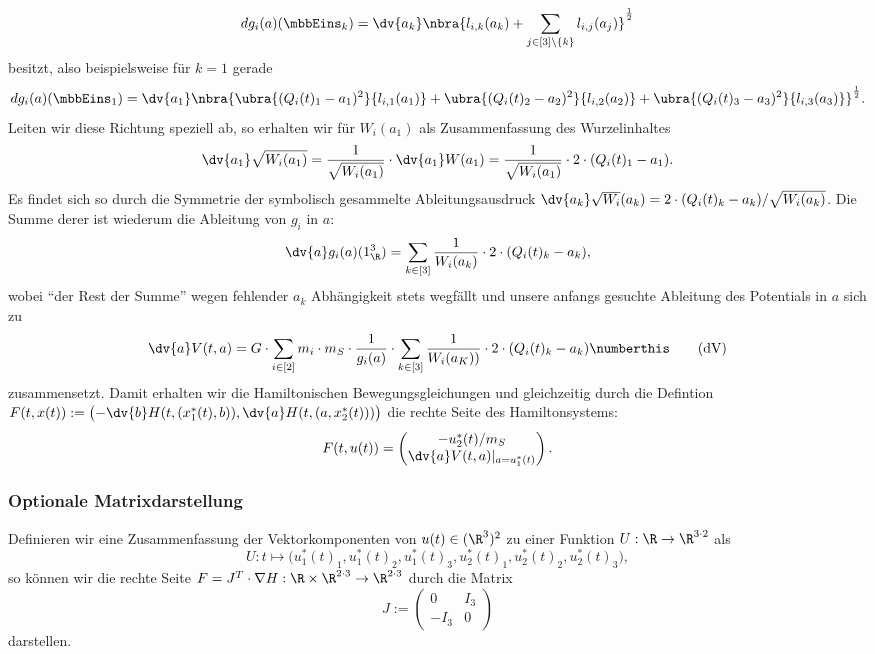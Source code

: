 \documentclass{subfiles}
\begin{document}
        \[
            dg_i(a)(\mbbEins_k) = \dv{a_k}\nbra{l_{i,k}(a_k) + \sum_{j\in[3]\setminus{\{k\}}}l_{i,j}(a_j)}^{\frac12}
        \]
        besitzt, also beispielsweise für $k=1$ gerade
        \[
            dg_i(a)(\mbbEins_1) = \dv{a_1}\nbra{\ubra{(Q_i(t)_1 - a_1)^2}{l_{i,1}(a_1)} + \ubra{(Q_i(t)_2 - a_2)^2}{l_{i,2}(a_2)} + \ubra{(Q_i(t)_3 - a_3)^2}{l_{i,3}(a_3)}}^{\frac12}.
        \]
        Leiten wir diese Richtung speziell ab, so erhalten wir für $W_i(a_1)$ als Zusammenfassung des Wurzelinhaltes
        \[
            \dv{a_1}\sqrt{W_i(a_1)} = \frac{1}{\sqrt{W_i(a_1)}}\cdot\dv{a_1}W(a_1) = \frac{1}{\sqrt{W_i(a_1)}}\cdot 2\cdot (Q_i(t)_1 - a_1). 
        \]
        Es findet sich so durch die Symmetrie der symbolisch gesammelte Ableitungsausdruck $\dv{a_k}\sqrt{W_i}(a_k) = 2\cdot (Q_i(t)_k - a_k) / \sqrt{W_i(a_k)}$. Die Summe derer ist wiederum die Ableitung von $g_i$ in $a$:
        \[
            \dv{a}g_i(a)(1_\R^3) = \sum_{k\in[3]}\frac{1}{W_i(a_k)}\cdot 2\cdot (Q_i(t)_k - a_k),
        \]
        wobei \enquote{der Rest der Summe} wegen fehlender $a_k$ Abhängigkeit stets wegfällt und unsere anfangs gesuchte Ableitung des Potentials in $a$ sich zu 
        \[
            \dv{a}V(t,a) = G\cdot\sum_{i\in[2]}m_i\cdot m_S\cdot\frac{1}{g_i(a)}\cdot\sum_{k\in[3]}\frac{1}{W_i(a_K))}\cdot 2\cdot (Q_i(t)_k - a_k)\numberthis\label{eq:dV}\tag{dV}
        \]
        zusammensetzt. Damit erhalten wir die Hamiltonischen Bewegungsgleichungen und gleichzeitig durch die Defintion $F(t,x(t)):=\bigl(-\dv{b}H(t,(x_1^*(t),b)),\dv{a}H(t,(a,x_2^*(t)))\bigr)$ die rechte Seite des Hamiltonsystems:
        \begin{align*}
            F(t,u(t)) = \begin{pmatrix}
                -u_2^*(t)/m_S\\
                \dv{a}V(t,a)|_{a=u_1^* (t)}
            \end{pmatrix}.
        \end{align*}

    \subsubsection*{Optionale Matrixdarstellung}
        Definieren wir eine Zusammenfassung der Vektorkomponenten von $u(t)\in(\R^3)^2$ zu einer Funktion $U:\R\to\R^{3\cdot 2}$ als
        \[
            U:t\mapsto \bigl(u_1^*(t)_1,u_1^*(t)_2,u_1^*(t)_3,u_2^*(t)_1,u_2^*(t)_2,u_2^*(t)_3\bigr),
        \]
        so können wir die rechte Seite $F=J^T\cdot\nabla H:\R\times\R^{2\cdot 3}\to\R^{2\cdot 3}$ durch die Matrix
        \[
            J:=\begin{pmatrix}
                0 & I_{3} \\
                -I_{3} & 0
            \end{pmatrix}
        \]
        darstellen.
\end{document}

